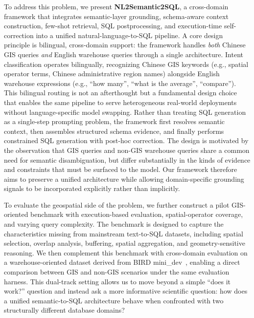 \documentclass[11pt]{article}
\begin{document}
To address this problem, we present \textbf{NL2Semantic2SQL}, a cross-domain framework that integrates semantic-layer grounding, schema-aware context construction, few-shot retrieval, SQL postprocessing, and execution-time self-correction into a unified natural-language-to-SQL pipeline. A core design principle is bilingual, cross-domain support: the framework handles \emph{both} Chinese GIS queries \emph{and} English warehouse queries through a single architecture. Intent classification operates bilingually, recognizing Chinese GIS keywords (e.g., spatial operator terms, Chinese administrative region names) alongside English warehouse expressions (e.g., ``how many'', ``what is the average'', ``compare''). This bilingual routing is not an afterthought but a fundamental design choice that enables the same pipeline to serve heterogeneous real-world deployments without language-specific model swapping. Rather than treating SQL generation as a single-step prompting problem, the framework first resolves semantic context, then assembles structured schema evidence, and finally performs constrained SQL generation with post-hoc correction. The design is motivated by the observation that GIS queries and non-GIS warehouse queries share a common need for semantic disambiguation, but differ substantially in the kinds of evidence and constraints that must be surfaced to the model. Our framework therefore aims to preserve a unified architecture while allowing domain-specific grounding signals to be incorporated explicitly rather than implicitly.

To evaluate the geospatial side of the problem, we further construct a pilot GIS-oriented benchmark with execution-based evaluation, spatial-operator coverage, and varying query complexity. The benchmark is designed to capture the characteristics missing from mainstream text-to-SQL datasets, including spatial selection, overlap analysis, buffering, spatial aggregation, and geometry-sensitive reasoning. We then complement this benchmark with cross-domain evaluation on a warehouse-oriented dataset derived from BIRD mini\_dev~\cite{li2023bird}, enabling a direct comparison between GIS and non-GIS scenarios under the same evaluation harness. This dual-track setting allows us to move beyond a simple ``does it work?'' question and instead ask a more informative scientific question: how does a unified semantic-to-SQL architecture behave when confronted with two structurally different database domains?
\end{document}
